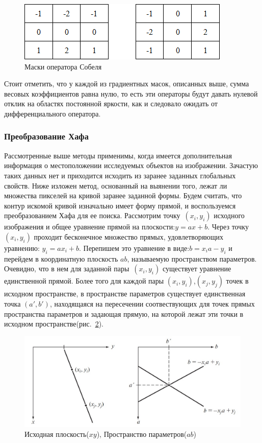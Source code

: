 \documentclass[12pt]{article} %
\begin{document}
\begin{figure}[h]
	
	\centering
	
	\includegraphics[width=0.4\linewidth]{grad_mask_sob.jpg}
	
	\caption{Маски оператора Собеля}
	
	\label{fig:grad_mask_sob}
	
\end{figure}

Стоит отметить, что у каждой из градиентных масок, описанных выше, сумма весовых коэффициентов равна нулю, то есть эти операторы будут давать нулевой отклик на областях постоянной яркости, как и следовало ожидать от дифференциального оператора.

\subsubsection{Преобразование Хафа}

Рассмотренные выше методы применимы, когда имеется дополнительная информация о местоположении исследуемых объектов на изображении. Зачастую таких данных нет и приходится исходить из заранее заданных глобальных свойств. Ниже изложен метод, основанный на выянении того, лежат ли множества пикселей на кривой заранее заданной формы.
Будем считать, что контур искомой кривой изначально имеет форму прямой, и воспользуемся преобразованием Хафа для ее поиска.
Рассмотрим точку~$(x_i, y_i)$ исходного изображения и общее уравнение прямой на плоскости:$y = ax+b$. Через точку~$(x_i, y_i)$ проходит бесконечное множество прямых, удовлетворяющих уравнению: $y_i = ax_i+b$. Перепишем это уравнение в виде:$b = x_i a - y_i$ и перейдем в координатную плоскость $ab$, называемую пространством параметров. Очевидно, что в нем для заданной пары~$(x_i, y_i)$ существует уравнение единственной прямой. Более того для каждой пары $(x_i, y_i)$,$(x_j, y_j)$ точек в исходном пространстве, в пространстве параметров существует единственная точка $(a', b')$, находящаяся на пересечении соотвествующих для точек прямых пространства параметров и задающая прямую, на которой лежат эти точки в исходном пространстве(рис.~\ref{fig:param_haf}).

\begin{figure}[h]
	
	\centering
	
	\includegraphics[width=0.6\linewidth]{param_haf.jpg}
	
	\caption{Исходная плоскость($xy$), Пространство параметров($ab$)}
	
	\label{fig:param_haf}
	
\end{figure}
\end{document}

